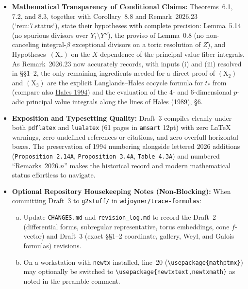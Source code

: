 \documentclass[11pt,letterpaper]{article}
\begin{document}
\begin{itemize}
\item \textbf{Mathematical Transparency of Conditional Claims:} Theorems~6.1, 7.2, and 8.3, together with Corollary~8.8 and Remark~2026.23 (`rem:7.status`), state their hypotheses with complete precision: Lemma~5.14 (no spurious divisors over $Y_1\setminus Y''$), the proviso of Lemma~0.8 (no non-canceling integral-$\beta$ exceptional divisors on a toric resolution of $Z$), and Hypotheses~$(\mathrm{X}_r)$ on the $X$-dependence of the principal value fiber integrals. As Remark~2026.23 now accurately records, with inputs (i) and (iii) resolved in \S\S1--2, the only remaining ingredients needed for a direct proof of $(\mathrm{X}_2)$ and $(\mathrm{X}_3)$ are the explicit Langlands--Hales cocycle formula for $t_*$ from \cite[Ch.~I, Cor.~5.4 and 5.7]{Ha92a} (compare also \href{https://publicationsthomashales.wordpress.com/wp-content/uploads/2016/03/twisted-endoscopy-gl4-gl5.pdf}{Hales 1994}) and the evaluation of the $4$- and $6$-dimensional $p$-adic principal value integrals along the lines of \href{https://www.numdam.org/article/AST_1989__171-172__195_0.pdf}{Hales (1989)}, \S6.
\item \textbf{Exposition and Typesetting Quality:} Draft~3 compiles cleanly under both \texttt{pdflatex} and \texttt{lualatex} (61 pages in \texttt{amsart} 12pt) with zero \LaTeX{} warnings, zero undefined references or citations, and zero overfull horizontal boxes. The preservation of 1994 numbering alongside lettered 2026 additions (\texttt{Proposition~2.14A}, \texttt{Proposition~3.4A}, \texttt{Table~4.3A}) and numbered ``Remarks~2026.$n$'' makes the historical record and modern mathematical status effortless to navigate.
\item \textbf{Optional Repository Housekeeping Notes (Non-Blocking):} When committing Draft~3 to \texttt{g2stuff/} in \texttt{wdjoyner/trace-formulas}:
  \begin{enumerate}[(a)]
  \item Update \texttt{CHANGES.md} and \texttt{revision\_log.md} to record the Draft~2 (differential forms, subregular representative, torus embeddings, cone $f$-vector) and Draft~3 (exact \S\S1--2 coordinate, gallery, Weyl, and Galois formulas) revisions.
  \item On a workstation with \texttt{newtx} installed, line~20 (\texttt{\textbackslash usepackage\{mathptmx\}}) may optionally be switched to \texttt{\textbackslash usepackage\{newtxtext,newtxmath\}} as noted in the preamble comment.
  \end{enumerate}
\end{itemize}
\end{document}
